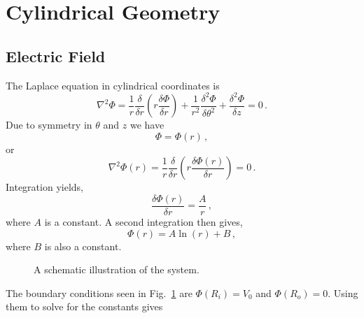 \documentclass[a4paper,10pt]{article}
\numberwithin{equation}{section}
\begin{document}
\clearpage
\section{Cylindrical Geometry}

\subsection{Electric Field}
The Laplace equation in cylindrical coordinates is
\begin{equation}
 \nabla^2\Phi = \frac{1}{r}\frac{\delta}{\delta r}\left( r \frac{\delta\Phi}{\delta r}\right)
              + \frac{1}{r^2}\frac{\delta^2\Phi}{\delta \theta^2} + \frac{\delta^2\Phi}{\delta z} = 0\, .
\end{equation}
Due to symmetry in \(\theta\) and \(z\) we have
\begin{equation}
 \Phi = \Phi(r)\, ,
\end{equation}
or
\begin{equation}
 \nabla^2\Phi(r) = \frac{1}{r}\frac{\delta}{\delta r}\left( r \frac{\delta\Phi(r)}{\delta r}\right) = 0\, .
\end{equation}
Integration yields,
\begin{equation}
  \frac{\delta \Phi(r)}{\delta r} = \frac{A}{r}\, ,
\end{equation}
where \(A\) is a constant. A second integration then gives,
\begin{equation}
  \Phi(r) = A\ln(r) + B\, ,
\end{equation}
where \(B\) is also a constant.
\begin{figure}[!h]
  \centering
  \caption{A schematic illustration of the system.}
  \label{fig:system}
\end{figure}
The boundary conditions seen in Fig.~\ref{fig:system} are \(\Phi(R_i) = V_0\) and \(\Phi(R_o) = 0\). Using them to solve for the constants gives
\end{document}

